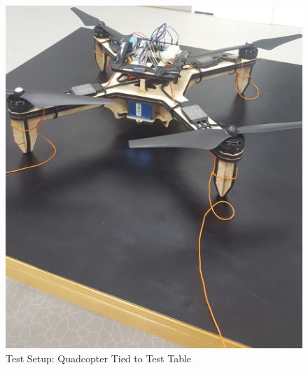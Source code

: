 \begin{figure}[h]
        \centering
         \begin{minipage}[b]{0.495\textwidth}
            \includegraphics[width = 1\textwidth]{VAPIQ-PICTURES/flighttest2}
            \caption{Test Setup: Quadcopter Tied to Test Table}
            \label{fig:ft1}
        \end{minipage}
        \hfill
        \begin{minipage}[b]{0.45\textwidth}

\end{minipage}
\end{figure}
